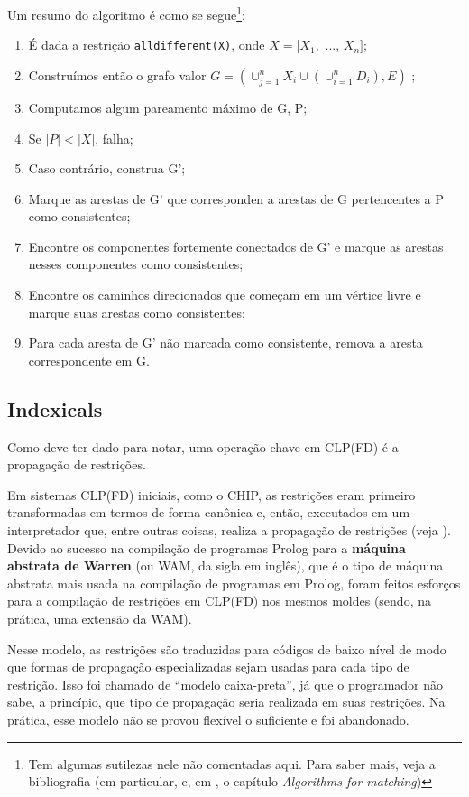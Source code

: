 \documentclass{article}
\begin{document}
Um resumo do algoritmo é como se segue\footnote{Tem algumas sutilezas nele não comentadas aqui. Para saber mais, veja a bibliografia (em particular, \cite{basileos} e, em \cite{cristo}, o capítulo \textit{Algorithms for matching})}:

\begin{enumerate}
  \item É dada a restrição {\tt alldifferent(X)}, onde $X = [X_1,$ ..., $X_n]$;
  \item Construímos então o grafo valor $G = (\cup_{j=1}^nX_i\cup(\cup_{i=1}^nD_i),E)$  ;
  \item Computamos algum pareamento máximo de G, P;
  \item Se $|P| < |X|$, falha;
  \item Caso contrário, construa G';
  \item Marque as arestas de G' que corresponden a arestas de G pertencentes a P como consistentes;
  \item Encontre os componentes fortemente conectados de G' e marque as arestas nesses componentes como consistentes;
  \item Encontre os caminhos direcionados que começam em um vértice livre e marque suas arestas como consistentes;
  \item Para cada aresta de G' não marcada como consistente, remova a aresta correspondente em G.
\end{enumerate}



\subsection{Indexicals}

Como deve ter dado para notar, uma operação chave em CLP(FD) é a propagação de restrições.

Em sistemas CLP(FD) iniciais, como o CHIP, as restrições eram primeiro transformadas em termos de forma canônica
e, então, executados em um interpretador que, entre outras coisas, realiza a propagação de restrições (veja \cite{zhou}).
Devido ao sucesso na compilação de programas Prolog para a \textbf{máquina abstrata de Warren} (ou WAM, da sigla em inglês),
que é o tipo de máquina abstrata mais usada na compilação de programas em Prolog, foram feitos esforços para a compilação
de restrições em CLP(FD) nos mesmos moldes (sendo, na prática, uma extensão da WAM).

Nesse modelo, as restrições são traduzidas para códigos de baixo nível de modo que formas de propagação especializadas sejam
usadas para cada tipo de restrição. Isso foi chamado de ``modelo caixa-preta'', já que o programador não sabe,
a princípio, que tipo de propagação seria realizada em suas restrições. Na prática, esse modelo não se provou flexível o suficiente
e foi abandonado.
\end{document}
